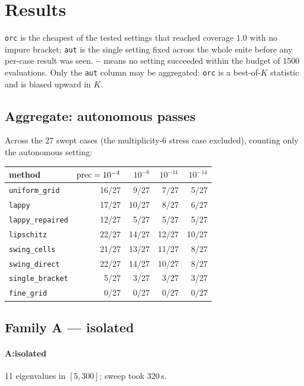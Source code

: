 \section{Results}

\texttt{orc} is the cheapest of the tested settings that reached coverage $1.0$ with no impure bracket; \texttt{aut} is the single setting fixed across the whole suite before any per-case result was seen. \textbf{--} means no setting succeeded within the budget of 1500 evaluations. Only the \texttt{aut} column may be aggregated: \texttt{orc} is a best-of-$K$ statistic and is biased upward in $K$.

\subsection{Aggregate: autonomous passes}

Across the 27 swept cases (the multiplicity-6 stress case excluded), counting only the autonomous setting:

\begin{center}
\begin{tabular}{lrrrr}
\toprule
method & $\mathrm{prec}=10^{-4}$ & $10^{-8}$ & $10^{-11}$ & $10^{-14}$ \\
\midrule
\texttt{uniform\_grid} & 16/27 & 9/27 & 7/27 & 5/27 \\
\texttt{lappy} & 17/27 & 10/27 & 8/27 & 6/27 \\
\texttt{lappy\_repaired} & 12/27 & 5/27 & 5/27 & 5/27 \\
\texttt{lipschitz} & 22/27 & 14/27 & 12/27 & 10/27 \\
\texttt{swing\_cells} & 21/27 & 13/27 & 11/27 & 8/27 \\
\texttt{swing\_direct} & 22/27 & 14/27 & 10/27 & 8/27 \\
\midrule
\texttt{single\_bracket} & 5/27 & 3/27 & 3/27 & 3/27 \\
\texttt{fine\_grid} & 0/27 & 0/27 & 0/27 & 0/27 \\
\bottomrule
\end{tabular}
\end{center}

\subsection{Family A --- isolated}

\paragraph{A:isolated} 11 eigenvalues in $[5, 300]$; sweep took 320\,s.

